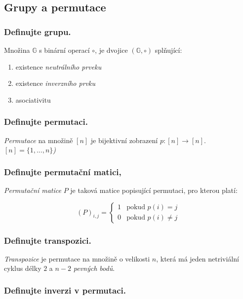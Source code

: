 \documentclass[10pt,a4paper]{article}
\begin{document}
\subsection{Grupy a permutace}
\subsubsection{Definujte grupu.}

Množina $\mathbb{G}$ s binární operací $\circ$, je dvojice $(\mathbb{G}, \circ)$ splňující:

\begin{enumerate}[label=(\roman*)]
    \item existence \textit{neutrálního prveku}
    \item existence \textit{inverzního prvku}
    \item asociativitu
\end{enumerate}

\subsubsection{Definujte permutaci.}

\textit{Permutace} na množině $[n]$ je bijektivní zobrazení $p: [n] \to [n]$. \textit{$[n] = \{1, ..., n\}$)}

\subsubsection{Definujte permutační matici,}

\textit{Permutační matice} $P$ je taková matice popisující permutaci, pro kterou platí:

\begin{equation*}
(P)_{i,j} = \begin{cases} 
1 &\text{pokud }  p(i) = j \\
0 &\text{pokud }  p(i) \neq j
\end{cases}
\end{equation*}

\subsubsection{Definujte transpozici.}

\textit{Transpozice} je permutace na množině o velikosti $n$, která má jeden netriviální cyklus délky $2$ a $n-2$ \textit{pevných bodů}.

\subsubsection{Definujte inverzi v permutaci.}
\end{document}
